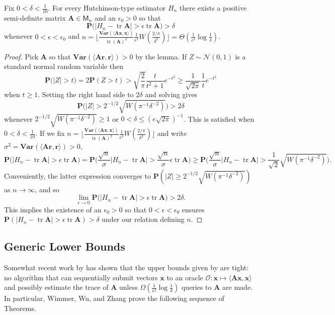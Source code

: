 \documentclass[10pt,letterpaper]{siamart171218}
\theoremstyle{definition}
\theoremstyle{remark}
\newcommand\inner[1]{\langle #1 \rangle}
\newcommand\M{\mathsf{M}}
\renewcommand\P{\mathbf{P}}
\renewcommand\O{\mathcal{O}}
\newcommand\Var{\mathbf{Var}}
\newcommand\tr{\operatorname{tr}}
\newcommand\N{\mathcal{N}}
\newcommand\A{\boldsymbol{A}}
\newcommand\x{\boldsymbol{x}}
\renewcommand\r{\boldsymbol{r}}
\begin{document}
\begin{theorem}
    Fix $0 < \delta < \tfrac{1}{10}$. For every Hutchinson-type estimator $H_n$
    there exists a positive semi-definite matrix $\A\in\M_n$ and an $\epsilon_0>0$ so that
    \[
        \P\bigl(|H_n - \tr\A| > \epsilon\tr\A\bigr) > \delta
    \]
    whenever $0 <\epsilon < \epsilon_0$ and $n = \lfloor\tfrac{\Var(\inner{\A\x,\x})}{\tr(\A)^2}
    \tfrac{1}{\epsilon^2} W(\tfrac{2/\pi}{\delta^2})\rfloor = \Theta(\tfrac{1}{\epsilon^2}
    \log\tfrac{1}{\delta})$.
\end{theorem}
\begin{proof}
    Pick $\A$ so that $\Var(\inner{\A\r,\r}) > 0$ by the lemma.
    If $Z\sim\N(0,1)$ is a standard normal random variable then
    \[
        \P\bigl(|Z| > t\bigr) = 2\P(Z > t) > \sqrt{\frac{2}{\pi}}\frac{t}{t^2 + 1}e^{-t^2} \geq \frac{1}{\sqrt{2\pi}}\frac{1}{t}e^{-t^2}
    \]
    when $t \geq 1$. \citep{cook2009upper} Setting the right hand side to $2\delta$ and solving
    gives
    \[
        \P\bigl(|Z| > 2^{-1/2}\sqrt{W(\pi^{-1}\delta^{-2})}\bigr) > 2\delta
    \]
    whenever $2^{-1/2}\sqrt{W(\pi^{-1}\delta^{-2})}\geq 1$ or
    $0 < \delta \leq (e\sqrt{2\pi})^{-1}$. This is satisfied when $0 < \delta < \tfrac{1}{10}$.
    If we fix $n = \lfloor\tfrac{\Var(\inner{\A\x,\x})}{\tr(\A)^2}
    \tfrac{1}{\epsilon^2} W(\tfrac{2/\pi}{\delta^2})\rfloor$ and write
    $\sigma^2 = \Var(\inner{\A\r,\r}) > 0$,
    \[
        \P\bigl(|H_n - \tr\A| > \epsilon\tr\A\bigr) = \P\biggl(\frac{\sqrt{n}}{\sigma}|H_n - \tr\A| > \frac{\sqrt{n}}{\sigma}\epsilon\tr\A \biggr) \geq \P\biggl(\frac{\sqrt{n}}{\sigma}|H_n - \tr\A| > \frac{1}{\sqrt{2}}\sqrt{W(\pi^{-1}\delta^{-2})}\biggr).
    \]
    Conveniently, the latter expression converges to
    $\P(|Z| \geq 2^{-1/2}\sqrt{W(\pi^{-1}\delta^{-2})})$ as $n\to\infty$,
    \citep[Thm\,5.10]{wasserman2013all} and so
    \[
        \lim_{\epsilon\to 0}\P\bigl(|H_n - \tr\A| > \epsilon\tr\A\bigr) > 2\delta.
    \]
    This implies the existence of an $\epsilon_0>0$ so that $0 < \epsilon < \epsilon_0$
    ensures $\P(|H_n - \tr\A| > \epsilon\tr\A) > \delta$ under our relation defining
    $n$.
\end{proof}

\subsection{Generic Lower Bounds}

Somewhat recent work by \cite{wimmer2014optimal} has shown that the upper bounds
given by \cite{roosta2015improved} are tight: no algorithm that can sequentially
submit vectors $\x$ to an oracle $\O : \x\mapsto \inner{\A\x,\x}$ and possibly estimate
the trace of $\A$ unless $\Omega(\tfrac{1}{\epsilon^2}\log\tfrac{1}{\delta})$ queries
to $\A$ are made. In particular, Wimmer, Wu, and Zhang prove the following sequence
of Theorems.
\end{document}
